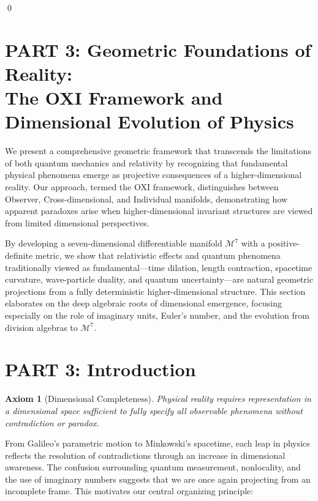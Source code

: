 \documentclass{article}
\newtheorem{axiom}{Axiom}
\begin{document}
\qed




\section{PART 3: Geometric Foundations of Reality: \\
The OXI Framework and Dimensional Evolution of Physics}

We present a comprehensive geometric framework that transcends the limitations of both quantum mechanics and relativity by recognizing that fundamental physical phenomena emerge as projective consequences of a higher-dimensional reality. Our approach, termed the OXI framework, distinguishes between Observer, Cross-dimensional, and Individual manifolds, demonstrating how apparent paradoxes arise when higher-dimensional invariant structures are viewed from limited dimensional perspectives.

By developing a seven-dimensional differentiable manifold \( \mathcal{M}^7 \) with a positive-definite metric, we show that relativistic effects and quantum phenomena traditionally viewed as fundamental---time dilation, length contraction, spacetime curvature, wave-particle duality, and quantum uncertainty---are natural geometric projections from a fully deterministic higher-dimensional structure. This section elaborates on the deep algebraic roots of dimensional emergence, focusing especially on the role of imaginary units, Euler's number, and the evolution from division algebras to \( \mathcal{M}^7 \).

\section{PART 3: Introduction}

\begin{axiom}[Dimensional Completeness]
Physical reality requires representation in a dimensional space sufficient to fully specify all observable phenomena without contradiction or paradox.
\end{axiom}

From Galileo's parametric motion to Minkowski's spacetime, each leap in physics reflects the resolution of contradictions through an increase in dimensional awareness. The confusion surrounding quantum measurement, nonlocality, and the use of imaginary numbers suggests that we are once again projecting from an incomplete frame. This motivates our central organizing principle:
\end{document}
